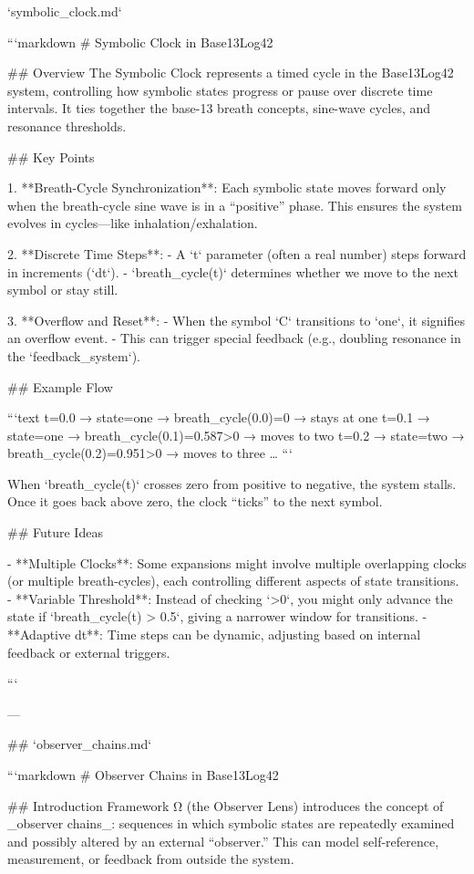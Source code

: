 
`symbolic_clock.md`

```markdown
# Symbolic Clock in Base13Log42

## Overview
The Symbolic Clock represents a timed cycle in the Base13Log42 system, controlling how symbolic states progress or pause over discrete time intervals. It ties together the base-13 breath concepts, sine-wave cycles, and resonance thresholds.

## Key Points

1. **Breath-Cycle Synchronization**:  
   Each symbolic state moves forward only when the breath-cycle sine wave is in a “positive” phase. This ensures the system evolves in cycles—like inhalation/exhalation.

2. **Discrete Time Steps**:  
   - A `t` parameter (often a real number) steps forward in increments (`dt`).
   - `breath_cycle(t)` determines whether we move to the next symbol or stay still.

3. **Overflow and Reset**:  
   - When the symbol `C` transitions to `one`, it signifies an overflow event.
   - This can trigger special feedback (e.g., doubling resonance in the `feedback_system`).

## Example Flow

```text
t=0.0   → state=one    → breath_cycle(0.0)=0  → stays at one
t=0.1   → state=one    → breath_cycle(0.1)=0.587>0 → moves to two
t=0.2   → state=two    → breath_cycle(0.2)=0.951>0 → moves to three
…
```

When `breath_cycle(t)` crosses zero from positive to negative, the system stalls. Once it goes back above zero, the clock “ticks” to the next symbol.

## Future Ideas

- **Multiple Clocks**: Some expansions might involve multiple overlapping clocks (or multiple breath-cycles), each controlling different aspects of state transitions.
- **Variable Threshold**: Instead of checking `>0`, you might only advance the state if `breath_cycle(t) > 0.5`, giving a narrower window for transitions.
- **Adaptive dt**: Time steps can be dynamic, adjusting based on internal feedback or external triggers.

```

---

## `observer_chains.md`

```markdown
# Observer Chains in Base13Log42

## Introduction
Framework Ω (the Observer Lens) introduces the concept of _observer chains_: sequences in which symbolic states are repeatedly examined and possibly altered by an external “observer.” This can model self-reference, measurement, or feedback from outside the system.

